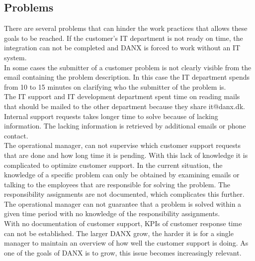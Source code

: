 \subsection{Problems}
There are several problems that can hinder the work practices that allows these goals to be reached. If the customer’s IT department is not ready on time, the integration can not be completed and DANX is forced to work without an IT system.\cite{lasse008}\\
In some cases the submitter of a customer problem is not clearly visible from the email containing the problem description. In this case the IT department spends from 10 to 15 minutes\cite{lasse013} on clarifying who the submitter of the problem is.\\
The IT support and IT development department spent time on reading mails that should be mailed to the other department because they share it@danx.dk.\cite{lasse010}\\
Internal support requests takes longer time to solve because of lacking information. The lacking information is retrieved by additional emails or phone contact.\\
The operational manager, can not supervise which customer support requests that are done and how long time it is pending. With this lack of knowledge it is complicated to optimize customer support. In the current situation, the knowledge of a specific problem can only be obtained by examining emails or talking to the employees that are responsible for solving the problem. The responsibility assignments are not documented, which complicates this further.\cite{gert012} The operational manager can not guarantee that a problem is solved within a given time period with no knowledge of the responsibility assignments.\\
With no documentation of customer support, KPIs of customer response time can not be established.\cite{gert011} The larger DANX grow, the harder it is for a single manager to maintain an overview of how well the customer support is doing. As one of the goals of DANX is to grow, this issue becomes increasingly relevant.

